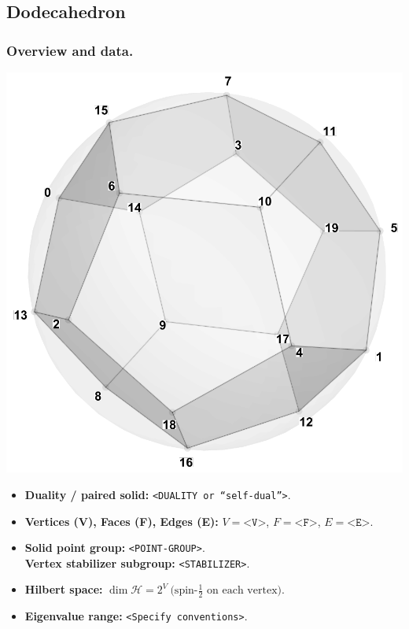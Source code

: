 \documentclass[11pt,a4paper]{article}
\begin{document}

\subsection*{Dodecahedron}

\subsubsection*{Overview and data.}
\begin{center}
  \includegraphics[width=.6\linewidth]{dodecahedron}
\end{center}

\begin{itemize}[leftmargin=1.5em]
  \item \textbf{Duality / paired solid:} \texttt{<DUALITY or “self-dual”>}.
  \item \textbf{Vertices (V), Faces (F), Edges (E):} $V=\texttt{<V>}$,\; $F=\texttt{<F>}$,\; $E=\texttt{<E>}$.
  \item \textbf{Solid point group:} \texttt{<POINT-GROUP>}.\\
        \textbf{Vertex stabilizer subgroup:} \texttt{<STABILIZER>}.
  \item \textbf{Hilbert space:} \(
        \dim\mathcal{H} = 2^{V}\ \text{(spin-$\tfrac12$ on each vertex).}
        \)
  \item \textbf{Eigenvalue range:} \texttt{<Specify conventions>}.
\end{itemize}
\end{document}
